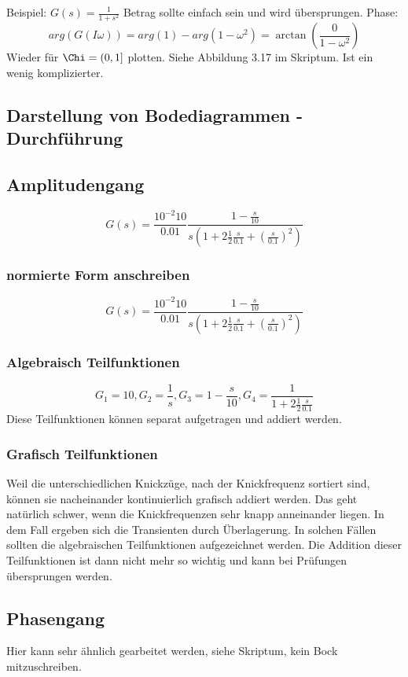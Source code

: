 \documentclass[a4paper]{article}
\begin{document}
Beispiel: $G(s)=\frac{1}{1+s^{2}}$ 
Betrag sollte einfach sein und wird übersprungen.
Phase:
\[ arg(G(I\omega))=arg(1)-arg(1-\omega^{2})=\arctan(\frac{0}{1-\omega^{2}}) \]
Wieder für $\Chi=(0, 1]$ plotten. Siehe Abbildung 3.17 im Skriptum. Ist ein wenig komplizierter.

\subsection*{Darstellung von Bodediagrammen - Durchführung}
\subsection*{Amplitudengang}
\[ G(s)=\frac{10^{-2} 10}{0.01} \frac{1-\frac{s}{10}}{s(1+2 \frac{1}{2} \frac{s}{0.1}+(\frac{s}{0.1})^{2})}\]

\subsubsection*{normierte Form anschreiben}
\[ G(s)=\frac{10^{-2} 10}{0.01} \frac{1-\frac{s}{10}}{s(1+2 \frac{1}{2} \frac{s}{0.1}+(\frac{s}{0.1})^{2})}\]

\subsubsection*{Algebraisch Teilfunktionen}
\[ G_{1}=10, G_{2}=\frac{1}{s}, G_{3}=1-\frac{s}{10}, G_{4}=\frac{1}{1+2 \frac{1}{2} \frac{s}{0.1} }\]
Diese Teilfunktionen können separat aufgetragen und addiert werden.

\subsubsection*{Grafisch Teilfunktionen}
Weil die unterschiedlichen Knickzüge, nach der Knickfrequenz sortiert sind, können sie nacheinander kontinuierlich grafisch addiert werden.
Das geht natürlich schwer, wenn die Knickfrequenzen sehr knapp anneinander liegen. In dem Fall ergeben sich die Transienten durch Überlagerung. In solchen Fällen sollten die algebraischen Teilfunktionen aufgezeichnet werden. Die Addition dieser Teilfunktionen ist dann nicht mehr so wichtig und kann bei Prüfungen übersprungen werden.

\subsection*{Phasengang}
Hier kann sehr ähnlich gearbeitet werden, siehe Skriptum, kein Bock mitzuschreiben.
\end{document}
